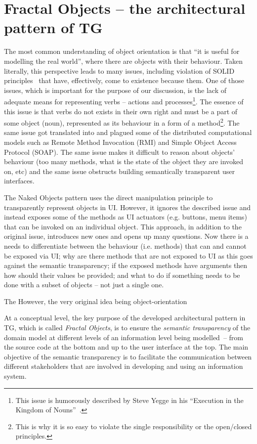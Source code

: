 \documentclass[a4paper,10pt,oneside,openright,final]{memoir} %
\begin{document}
\section*{Fractal Objects -- the architectural pattern of TG}
	The most common understanding of object orientation is that ``it is useful for modelling the real world'', where there are objects with their behaviour.
	Taken literally, this perspective leads to many issues, including violation of SOLID principles~\cite{SOLID} that have, effectively, come to existence because them.
	One of those issues, which is important for the purpose of our discussion, is the lack of adequate means for representing verbs -- actions and processes\footnote{This issue is humorously  described by Steve Yegge in his ``Execution in the Kingdom of Nouns''~\cite{yegge2006}.}.
	The essence of this issue is that verbs do not exists in their own right and must be a part of some object (noun), represented as its behaviour in a form of a method\footnote{This is why it is so easy to violate the single responsibility or the open/closed principles.}.
	The same issue got translated into and plagued some of the distributed computational models such as Remote Method Invocation (RMI) and Simple Object Access Protocol (SOAP).
	The same issue makes it difficult to reason about objects' behaviour (too many methods, what is the state of the object they are invoked on, etc) and the same issue obstructs building semantically transparent user interfaces.
	
	The Naked Objects pattern uses the direct manipulation principle to transparently represent objects in UI.
	However, it ignores the described issue and instead exposes some of the methods as UI actuators (e.g. buttons, menu items) that can be invoked on an individual object.
	This approach, in addition to the original issue, introduces new ones and opens up many questions.
	Now there is a needs to differentiate between the behaviour (i.e. methods) that can and cannot be exposed via UI; why are there methods that are not exposed to UI as this goes against the semantic transparency; if the exposed methods have arguments then how should their values be provided; and what to do if something needs to be done with a subset of objects -- not just a single one.
	
	
	
	The
	However, the very original idea being object-orientation
	 

	At a conceptual level, the key purpose of the developed architectural pattern in TG, which is called \emph{Fractal Objects}, is to ensure the \emph{semantic transparency} of the domain model at different levels of an information level being modelled~-- from the source code at the bottom and up to the user interface at the top.
  	The main objective of the semantic transparency is to facilitate the communication between different stakeholders that are involved in developing and using an information system.
\end{document}
